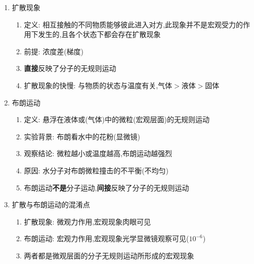 \documentclass{article}
\begin{document}
\begin{enumerate}
    \item 扩散现象
          \begin{enumerate}[label = (\arabic*)]
              \item 定义: 相互接触的不同物质能够彼此进入对方,此现象并不是宏观受力的作用下发生的,且各个状态下都会存在扩散现象
              \item 前提: 浓度差(梯度)
              \item \textbf{直接}反映了分子的无规则运动
              \item 扩散现象的快慢: 与物质的状态与温度有关,气体$>$液体$>$固体
          \end{enumerate}
    \item 布朗运动
          \begin{enumerate}[label = (\arabic*)]
              \item 定义: 悬浮在液体或(气体)中的微粒(宏观层面)的无规则运动
              \item 实验背景: 布朗看水中的花粉(显微镜)
              \item 观察结论: 微粒越小或温度越高,布朗运动越强烈
              \item 原因: 水分子对布朗微粒撞击的不平衡(不均匀)
              \item 布朗运动\textbf{不是}分子运动,\textbf{间接}反映了分子的无规则运动
          \end{enumerate}
    \item 扩散与布朗运动的混淆点
          \begin{enumerate}[label = (\arabic*)]
              \item 扩散现象: 微观力作用,宏观现象肉眼可见
              \item 布朗运动: 宏观力作用,宏观现象光学显微镜观察可见($10^{-6}$)
              \item 两者都是微观层面的分子无规则运动所形成的宏观现象
          \end{enumerate}
\end{enumerate}

\vspace{2em}
\end{document}
